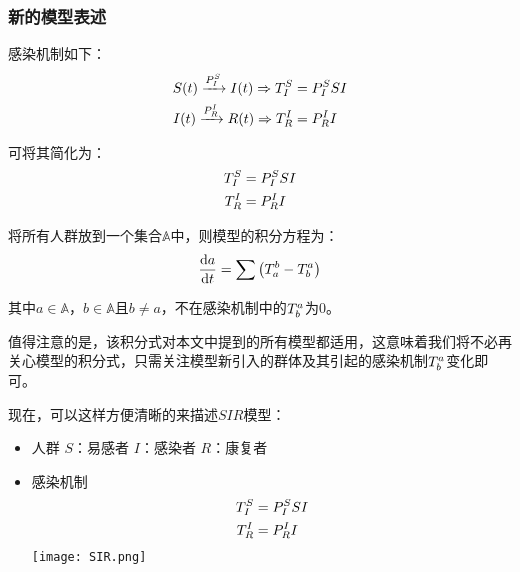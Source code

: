 \subsubsection{新的模型表述}
\par 感染机制如下：
\begin{align}
	S(t)\xrightarrow{P^{S}_{I}}I(t) \Rightarrow T^{S}_{I}&=P^{S}_{I}SI \\
	I(t)\xrightarrow{P^{I}_{R}}R(t) \Rightarrow T^{I}_{R}&=P^{I}_{R}I
\end{align}
\par 可将其简化为：
\begin{align}
	T^{S}_{I}&=P^{S}_{I}SI \\
	T^{I}_{R}&=P^{I}_{R}I
\end{align}
\par 将所有人群放到一个集合$\mathbb{A}$中，则模型的积分方程为：
\begin{equation}
	\frac{\mathrm{d}a}{\mathrm{d}t} = \sum\left(T^{b}_{a}-T^{a}_{b}\right)
\end{equation}
\par 其中$a\in\mathbb{A}$，$b\in\mathbb{A}$且$b\not=a$，不在感染机制中的$T^{a}_{b}$为$0$。
\par 值得注意的是，该积分式对本文中提到的所有模型都适用，这意味着我们将不必再关心模型的积分式，只需关注模型新引入的群体及其引起的感染机制$T^{a}_{b}$变化即可。
\par 现在，可以这样方便清晰的来描述$SIR$模型：
\begin{itemize}
	\item 人群
	      \subitem $S$：易感者
	      \subitem $I$：感染者
	      \subitem $R$：康复者
	\item 感染机制
	      \subitem
	      \begin{align}
		      T^{S}_{I}&=P^{S}_{I}SI \\
		      T^{I}_{R}&=P^{I}_{R}I
	      \end{align}
	      \texttt{[image: SIR.png]}
\end{itemize}
